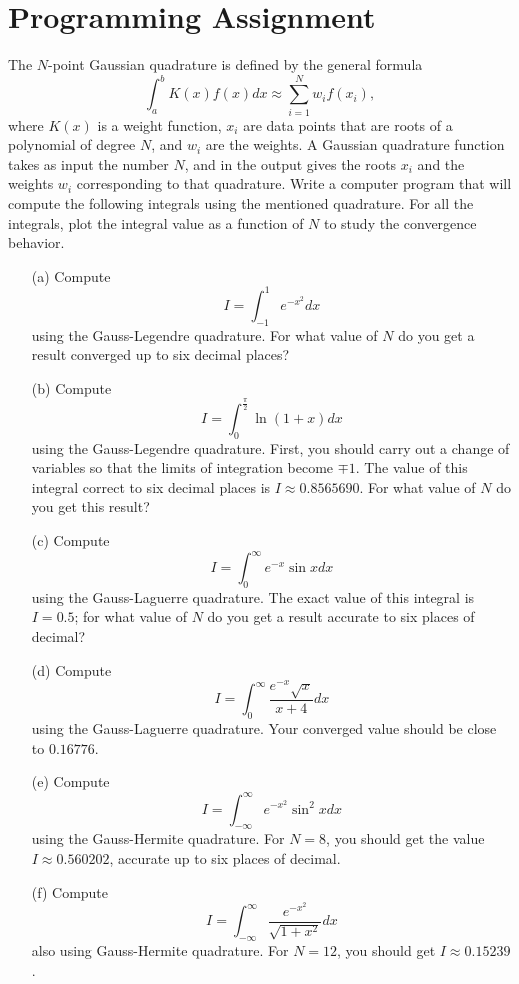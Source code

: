 \documentclass{article}
\begin{document}
\section*{Programming Assignment}

The $N$-point Gaussian quadrature is defined by the general formula
\begin{equation}
    \int_{a}^{b} K(x)f(x)dx \approx \sum_{i=1}^{N}w_if(x_i),
\end{equation}
where $K(x)$ is a weight function, $x_i$ are data points that are roots of a polynomial of degree $N$, and $w_i$ are the weights. A Gaussian quadrature function takes as input the number $N$, and in the output gives the roots $x_i$ and the weights $w_i$ corresponding to that quadrature. Write a computer program that will compute the following integrals using the mentioned quadrature. For all the integrals, plot the integral value as a function of $N$ to study the convergence behavior.

\begin{enumerate}
    \item[(a)] Compute
    \[
    I = \int_{-1}^{1} e^{-x^2} dx
    \]
    using the Gauss-Legendre quadrature. For what value of $N$ do you get a result converged up to six decimal places?
    
    \item[(b)] Compute
    \[
    I = \int_{0}^{\frac{\pi}{2}} \ln(1 + x) dx
    \]
    using the Gauss-Legendre quadrature. First, you should carry out a change of variables so that the limits of integration become $\mp 1$. The value of this integral correct to six decimal places is $I \approx 0.8565690$. For what value of $N$ do you get this result?
    
    \item[(c)] Compute
    \[
    I = \int_{0}^{\infty} e^{-x} \sin x dx
    \]
    using the Gauss-Laguerre quadrature. The exact value of this integral is $I = 0.5$; for what value of $N$ do you get a result accurate to six places of decimal?
    
    \item[(d)] Compute
    \[
    I = \int_{0}^{\infty} \frac{e^{-x} \sqrt{x}}{x + 4} dx
    \]
    using the Gauss-Laguerre quadrature. Your converged value should be close to $0.16776$.
    
    \item[(e)] Compute
    \[
    I = \int_{-\infty}^{\infty} e^{-x^2} \sin^2 x dx
    \]
    using the Gauss-Hermite quadrature. For $N = 8$, you should get the value $I \approx 0.560202$, accurate up to six places of decimal.
    
    \item[(f)] Compute
    \[
    I = \int_{-\infty}^{\infty} \frac{e^{-x^2}}{\sqrt{1 + x^2}} dx
    \]
    also using Gauss-Hermite quadrature. For $N = 12$, you should get $I \approx 0.15239$.
\end{enumerate}
\end{document}
